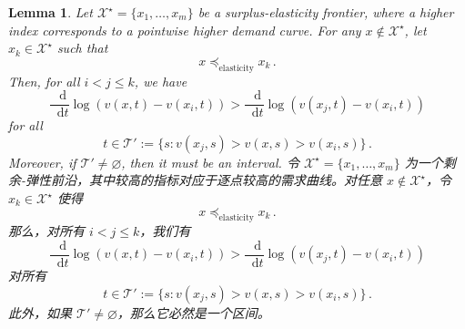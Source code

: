 \documentclass[12pt,letterpaper]{article}
\newenvironment{original}{\color{black}\noindent}{}
\newenvironment{translation}{\color{blue}\noindent}{}
\theoremstyle{plain}
\newtheorem{lemma}{Lemma}
\theoremstyle{definition}
\theoremstyle{remark}
\let\emptyset\varnothing
\renewcommand{\1}{\mathds{1}}
\renewcommand*\d{\mathop{}\!\mathrm{d}}
\newcommand{\X}{\mathcal{X}}
\theoremstyle{definition}
\begin{document}
\begin{lemma}\label{lem:inequality}
\begin{original}
Let $\X^\star =\{x_1, \dots, x_m\}$ be a surplus-elasticity frontier, where a higher index corresponds to a pointwise higher demand curve. For any $x \not \in \X^\star$, let $x_k \in \X^\star$ such that
\[x \preceq_{\text{elasticity}} x_k \,.\]
Then, for all $i < j \leq k$, we have
\[  \frac{\d}{\d t}   \log(v(x, t) - v(x_i, t))  >  \frac{\d}{\d t}   \log(v(x_j, t) - v(x_i, t))\]
for all
\[t \in \mathcal{T}':=\big\{s: v(x_j, s) >  v(x, s) > v(x_i, s)\big\}\,.\]
Moreover, if $\mathcal{T}' \neq \emptyset$, then it must be an interval.
\end{original}
\begin{translation}
令 $\X^\star =\{x_1, \dots, x_m\}$ 为一个剩余-弹性前沿，其中较高的指标对应于逐点较高的需求曲线。对任意 $x \not \in \X^\star$，令 $x_k \in \X^\star$ 使得
\[x \preceq_{\text{elasticity}} x_k \,.\]
那么，对所有 $i < j \leq k$，我们有
\[  \frac{\d}{\d t}   \log(v(x, t) - v(x_i, t))  >  \frac{\d}{\d t}   \log(v(x_j, t) - v(x_i, t))\]
对所有
\[t \in \mathcal{T}':=\big\{s: v(x_j, s) >  v(x, s) > v(x_i, s)\big\}\,.\]
此外，如果 $\mathcal{T}' \neq \emptyset$，那么它必然是一个区间。
\end{translation}
\end{lemma}
\end{document}
